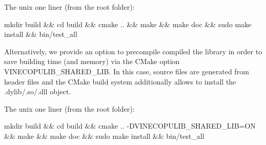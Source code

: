 The unix one liner (from the root folder)\+:


\begin{DoxyCode}
mkdir build && cd build && cmake .. && make && make doc &&
sudo make install && bin/test\_all
\end{DoxyCode}


Alternatively, we provide an option to precompile compiled the library in order to save building time (and memory) via the C\+Make option {\ttfamily V\+I\+N\+E\+C\+O\+P\+U\+L\+I\+B\+\_\+\+S\+H\+A\+R\+E\+D\+\_\+\+L\+IB}. In this case, source files are generated from header files and the C\+Make build system additionally allows to install the .dylib/.so/.dll object.

The unix one liner (from the root folder)\+:


\begin{DoxyCode}
mkdir build && cd build && cmake .. -DVINECOPULIB\_SHARED\_LIB=ON && make &&
make doc && sudo make install && bin/test\_all
\end{DoxyCode}


